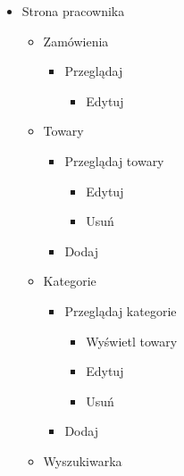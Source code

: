 \documentclass[10pt,a4paper]{article}
\begin{document}
\begin{itemize}
	    \item Strona pracownika
		\begin{itemize}
		\item Zamówienia
		  \begin{itemize}
		    \item Przeglądaj
		    \begin{itemize}
		    \item Edytuj
		    \end{itemize}
		  \end{itemize}
		\item Towary
		\begin{itemize}
		  \item Przeglądaj towary
		  \begin{itemize}
		    \item Edytuj
			\item Usuń
		  \end{itemize}
		  \item Dodaj
		\end{itemize}
		\item Kategorie
		\begin{itemize}
		  \item Przeglądaj kategorie
		  \begin{itemize}
		    \item Wyświetl towary
			\item Edytuj
			\item Usuń
		  \end{itemize}
		  \item Dodaj
		\end{itemize}
		\item Wyszukiwarka
	    \end{itemize}
		

\end{itemize}
\end{document}
